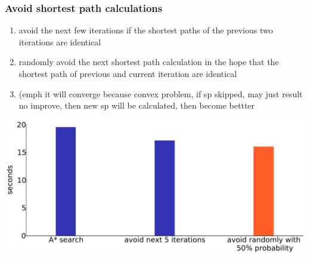 \documentclass{beamer}
\begin{document}
\begin{frame}
    \frametitle{Avoid shortest path calculations}
    \begin{enumerate}
        \item avoid the next few iterations if the shortest paths of the previous two iterations are identical
        \item randomly avoid the next shortest path calculation in the hope that the shortest path of previous and current iteration are identical
        \item (emph it will converge because convex problem, if sp skipped, may just result no improve, then new sp will be calculated, then become bettter
    \end{enumerate}
    \begin{center}
        \includegraphics[width=.9\textwidth, keepaspectratio]{img/random_runtime}
    \end{center}
\end{frame}
\end{document}
